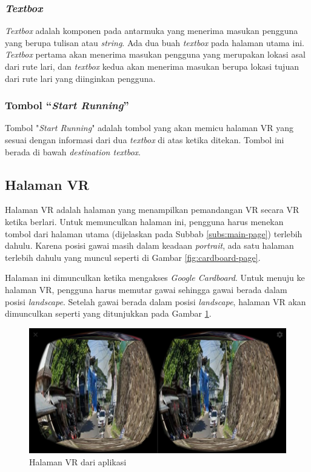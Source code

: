\subsubsection{\textit{Textbox}} 
\textit{Textbox} adalah komponen pada antarmuka yang menerima masukan pengguna yang berupa tulisan atau \textit{string}. Ada dua buah \textit{textbox} pada halaman utama ini. \textit{Textbox} pertama akan menerima masukan pengguna yang merupakan lokasi asal dari rute lari, dan \textit{textbox} kedua akan menerima masukan berupa lokasi tujuan dari rute lari yang diinginkan pengguna.   

\subsubsection{Tombol ``\textit{Start Running}''}
Tombol "\textit{Start Running}" adalah tombol yang akan memicu halaman VR yang sesuai dengan informasi dari dua \textit{textbox} di atas ketika ditekan. Tombol ini berada di bawah \textit{destination textbox}.

\subsection{Halaman VR}
Halaman VR adalah halaman yang menampilkan pemandangan VR secara VR ketika berlari. Untuk memunculkan halaman ini, pengguna harus menekan tombol dari halaman utama (dijelaskan pada Subbab \ref{subs:main-page}) terlebih dahulu. Karena posisi gawai masih dalam keadaan \textit{portrait}, ada satu halaman terlebih dahulu yang muncul seperti di Gambar \ref{fig:cardboard-page}. 

Halaman ini dimunculkan ketika mengakses \textit{Google Cardboard}. Untuk menuju ke halaman VR, pengguna harus memutar gawai sehingga gawai berada dalam posisi \textit{landscape}. Setelah gawai berada dalam posisi \textit{landscape}, halaman VR akan dimunculkan seperti yang ditunjukkan pada Gambar \ref{fig:vr-page}.

\begin{figure}[h]
	\centering
		\includegraphics[scale=0.4]{Gambar/vr-page.png}
	\caption{Halaman VR dari aplikasi}
	\label{fig:vr-page}
\end{figure}

